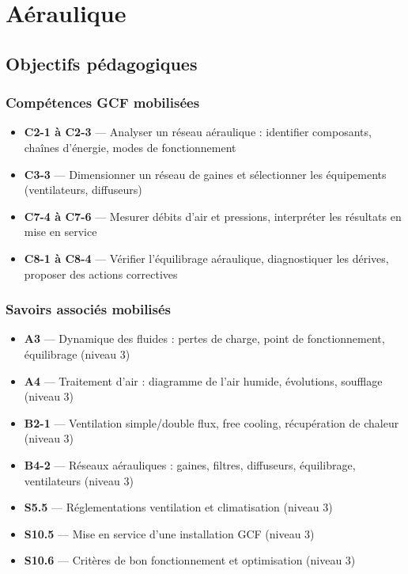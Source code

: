 \chapter{Aéraulique}

\section{Objectifs pédagogiques}

\subsection*{Compétences GCF mobilisées}
\begin{itemize}
  \item \textbf{C2-1 à C2-3} — Analyser un réseau aéraulique : identifier composants, chaînes d'énergie, modes de fonctionnement
  \item \textbf{C3-3} — Dimensionner un réseau de gaines et sélectionner les équipements (ventilateurs, diffuseurs)
  \item \textbf{C7-4 à C7-6} — Mesurer débits d'air et pressions, interpréter les résultats en mise en service
  \item \textbf{C8-1 à C8-4} — Vérifier l'équilibrage aéraulique, diagnostiquer les dérives, proposer des actions correctives
\end{itemize}

\subsection*{Savoirs associés mobilisés}
\begin{itemize}
  \item \textbf{A3} — Dynamique des fluides : pertes de charge, point de fonctionnement, équilibrage (niveau 3)
  \item \textbf{A4} — Traitement d'air : diagramme de l'air humide, évolutions, soufflage (niveau 3)
  \item \textbf{B2-1} — Ventilation simple/double flux, free cooling, récupération de chaleur (niveau 3)
  \item \textbf{B4-2} — Réseaux aérauliques : gaines, filtres, diffuseurs, équilibrage, ventilateurs (niveau 3)
  \item \textbf{S5.5} — Réglementations ventilation et climatisation (niveau 3)
  \item \textbf{S10.5} — Mise en service d'une installation GCF (niveau 3)
  \item \textbf{S10.6} — Critères de bon fonctionnement et optimisation (niveau 3)
\end{itemize}

